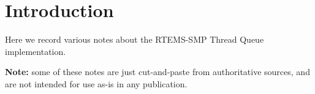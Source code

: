 \section{Introduction}

Here we record various notes about the RTEMS-SMP Thread Queue implementation.

\textbf{Note:}
\textsf{some of these notes are just cut-and-paste from authoritative sources,
and are not intended for use as-is in any publication.} 
